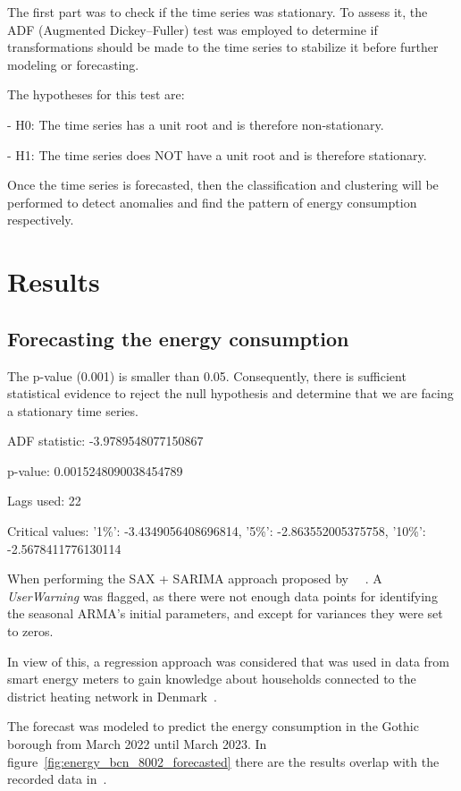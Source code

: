 \documentclass[a4paper,12pt,twoside]{ThesisStyle}
\begin{document}
The first part was to check if the time series was stationary. To assess it, the ADF (Augmented Dickey–Fuller) test was employed to determine if transformations should be made to the time series to stabilize it before further modeling or forecasting.

The hypotheses for this test are:

- H0: The time series has a unit root and is therefore non-stationary.

- H1: The time series does NOT have a unit root and is therefore stationary.

Once the time series is forecasted, then the classification and clustering will be performed to detect anomalies and find the pattern of energy consumption respectively.

\chapter{Results}
\label{cap:result}

\section{Forecasting the energy consumption}

The p-value (0.001) is smaller than 0.05. Consequently, there is sufficient statistical evidence to reject the null hypothesis and determine that we are facing a stationary time series.

ADF statistic: -3.9789548077150867

p-value: 0.0015248090038454789

Lags used: 22

Critical values: {'1\%': -3.4349056408696814, '5\%': -2.863552005375758, '10\%': -2.5678411776130114}

When performing the SAX + SARIMA approach proposed by~\cite{Carbone2017heating} ~\cite{fonseca2017unsupervised}. A \textit{UserWarning} was flagged, as there were not enough data points for identifying the seasonal ARMA's initial parameters, and except for variances they were set to zeros.

In view of this, a regression approach was considered that was used in data from smart energy meters to gain knowledge about households connected to the district heating network in Denmark~\cite{leiria2021using}.
  
The forecast was modeled to predict the energy consumption in the Gothic borough from March 2022 until March 2023. In figure~\ref{fig:energy_bcn_8002_forecasted} there are the results overlap with the recorded data in~\cite{ElectricityBCNOD}.
\end{document}
